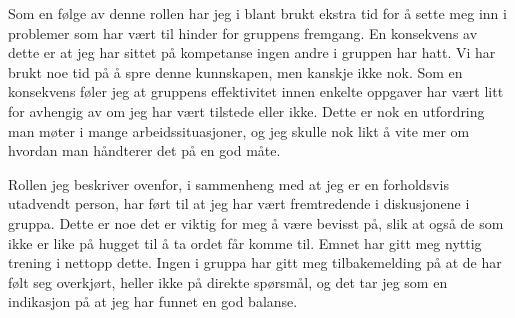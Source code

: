Som en følge av denne rollen har jeg i blant brukt ekstra tid for å sette meg inn i problemer som har vært til hinder for gruppens fremgang. En konsekvens av dette er at jeg har sittet på kompetanse ingen andre i gruppen har hatt. Vi har brukt noe tid på å spre denne kunnskapen, men kanskje ikke nok. Som en konsekvens føler jeg at gruppens effektivitet innen enkelte oppgaver har vært litt for avhengig av om jeg har vært tilstede eller ikke. Dette er nok en utfordring man møter i mange arbeidssituasjoner, og jeg skulle nok likt å vite mer om hvordan man håndterer det på en god måte.

Rollen jeg beskriver ovenfor, i sammenheng med at jeg er en forholdsvis utadvendt person, har ført til at jeg har vært fremtredende i diskusjonene i gruppa. Dette er noe det er viktig for meg å være bevisst på, slik at også de som ikke er like på hugget til å ta ordet får komme til. Emnet har gitt meg nyttig trening i nettopp dette. Ingen i gruppa har gitt meg tilbakemelding på at de har følt seg overkjørt, heller ikke på direkte spørsmål, og det tar jeg som en indikasjon på at jeg har funnet en god balanse.